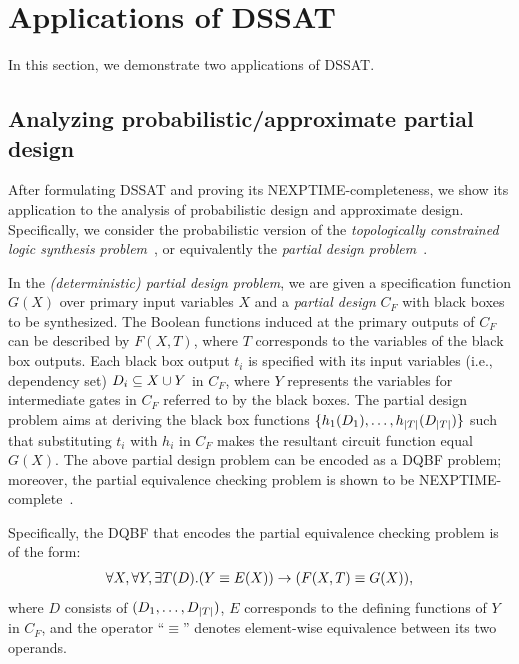 \section{Applications of DSSAT}
\label{sect:dssat-application}

In this section, we demonstrate two applications of DSSAT.

\subsection{Analyzing probabilistic/approximate partial design}
After formulating DSSAT and proving its NEXPTIME-completeness,
we show its application to the analysis of probabilistic design and approximate design.
Specifically, we consider the probabilistic version of the \textit{topologically constrained logic synthesis problem}~\cite{Sinha2002,Balabanov2014},
or equivalently the \textit{partial design problem}~\cite{Gitina2013}.

In the \textit{(deterministic) partial design problem},
we are given a specification function $G(X)$ over primary input variables $X$ and
a \textit{partial design} $C_F$ with black boxes to be synthesized.
The Boolean functions induced at the primary outputs of $C_F$ can be described by $F(X,T)$,
where $T$ corresponds to the variables of the black box outputs.
Each black box output $t_i$ is specified with its input variables (i.e., dependency set) $D_{i}\subseteq X \cup Y$ in $C_F$,
where $Y$ represents the variables for intermediate gates in $C_F$ referred to by the black boxes.
The partial design problem aims at deriving the black box functions $\{h_1(D_{1}),\ldots,h_{|T|}(D_{|T|})\}$
such that substituting $t_i$ with $h_i$ in $C_F$ makes the resultant circuit function equal $G(X)$.
The above partial design problem can be encoded as a DQBF problem;
moreover, the partial equivalence checking problem is shown to be NEXPTIME-complete~\cite{Gitina2013}.

Specifically, the DQBF that encodes the partial equivalence checking problem is of the form:
\begin{align}
    \label{eq:dssat-dqbf-partial-design}
    \forall X,\forall Y,\exists T(D).(Y \equiv E(X)) \rightarrow (F(X,T)\equiv G(X)),
\end{align}
where $D$ consists of $(D_{1},\ldots,D_{|T|})$,
$E$ corresponds to the defining functions of $Y$ in $C_F$,
and the operator ``$\equiv$'' denotes element-wise equivalence between its two operands.

